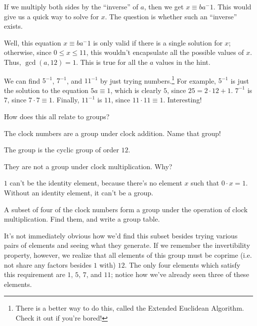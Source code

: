 \documentclass[../key.tex]{subfiles}
\begin{document}
If we multiply both sides by the ``inverse'' of $a$, then we get $x\equiv ba^-1$. This would give us a quick way to solve for $x$. The question is whether such an ``inverse'' exists.

Well, this equation $x\equiv ba^-1$ is only valid if there is a single solution for $x$; otherwise, since $0\leq x \leq 11$, this wouldn't encapsulate all the possible values of $x$. Thus, $\gcd(a,12)=1$. This is true for all the $a$ values in the hint.

We can find $5^{-1}$, $7^{-1}$, and $11^{-1}$ by just trying numbers.\footnote{There is a better way to do this, called the Extended Euclidean Algorithm. Check it out if you're bored!} For example, $5^{-1}$ is just the solution to the equation $5a\equiv 1$, which is clearly $5$, since $25=2\cdot 12 + 1$. $7^{-1}$ is $7$, since $7\cdot 7 \equiv 1$. Finally, $11^{-1}$ is $11$, since $11\cdot 11\equiv 1$. Interesting!

\begin{outer_problem}
\item How does this all relate to groups?
\end{outer_problem}

\begin{inner_problem}[start=1]
\item The clock numbers are a group under clock addition. Name that group!
\end{inner_problem}

The group is the cyclic group of order $12$.

\begin{inner_problem}
\item They are not a group under clock multiplication. Why?
\end{inner_problem}

$1$ can't be the identity element, because there's no element $x$ such that $0\cdot x = 1$. Without an identity element, it can't be a group.

\begin{inner_problem}
\item A subset of four of the clock numbers form a group under the operation of clock multiplication. Find them, and write a group table.
\end{inner_problem}

It's not immediately obvious how we'd find this subset besides trying various pairs of elements and seeing what they generate. If we remember the invertibility property, however, we realize that all elements of this group must be coprime (i.e. not share any factors besides $1$ with) $12$. The only four elements which satisfy this requirement are $1$, $5$, $7$, and $11$; notice how we've already seen three of these elements.
\end{document}
